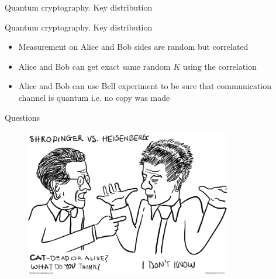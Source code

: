 \documentclass[10pt,pdf,hyperref={unicode}]{beamer}
\begin{document}
\begin{frame}{Quantum cryptography. Key distribution}
 \begin{figure} 
   
 \end{figure}
\end{frame}

\begin{frame}{Quantum cryptography. Key distribution}
  \begin{itemize}
    \item Measurement on Alice and Bob sides are random but
      correlated
    \item Alice and Bob can get exact same random $K$ using the
      correlation
      \item Alice and Bob can use Bell experiment to be sure that
        communication channel is quantum i.e. no copy was made
  \end{itemize}
\end{frame}


\begin{frame}{Questions}
 \begin{figure} 
   \includegraphics[width=90mm,scale=0.5]{questions.png}
  \end{figure}
\end{frame}
\end{document}
